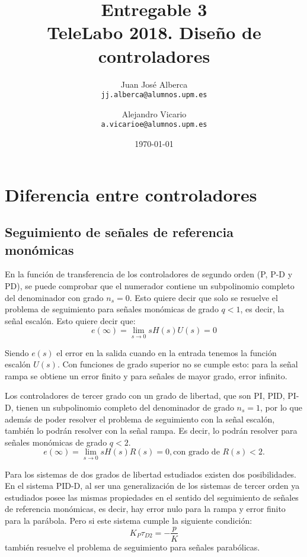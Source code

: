 \documentclass[a4paper]{article}
\begin{document}
\title{Entregable 3 \\
\large TeleLabo 2018. Diseño de controladores}
\author{
	Juan José Alberca\\
	\texttt{jj.alberca@alumnos.upm.es}
	\and
	Alejandro Vicario\\
	\texttt{a.vicarioe@alumnos.upm.es}
}
\date{\today}


\maketitle


\section{Diferencia entre controladores}
\subsection{Seguimiento de señales de referencia monómicas}
En la función de transferencia de los controladores de segundo orden (P, P-D y PD), se puede comprobar que el numerador contiene un subpolinomio completo del denominador con grado $n_s=0$. Esto quiere decir que solo se resuelve el problema de seguimiento para señales monómicas de grado $q<1$, es decir, la señal escalón. Esto quiere decir que:
\begin{equation}
	e(\infty)=\lim_{s \rightarrow 0}
	s H(s) U(s) = 0
\end{equation}

Siendo $e(s)$ el error en la salida cuando en la entrada tenemos la función escalón $U(s)$. Con funciones de grado superior no se cumple esto: para la señal rampa se obtiene un error finito y para señales de mayor grado, error infinito.

Los controladores de tercer grado con un grado de libertad, que son PI, PID, PI-D, tienen un subpolinomio completo del denominador de grado $n_s=1$, por lo que además de poder resolver el problema de seguimiento con la señal escalón, también lo podrán resolver con la señal rampa. Es decir, lo podrán resolver para señales monómicas de grado $q<2$.
\begin{equation}
e(\infty)=\lim_{s \rightarrow 0}
s H(s) R(s) = 0, \textrm{con grado de } R(s)<2. 
\end{equation}

Para los sistemas de dos grados de libertad estudiados existen dos posibilidades. En el sistema PID-D, al ser una generalización de los sistemas de tercer orden ya estudiados posee las mismas propiedades en el sentido del seguimiento de señales de referencia monómicas, es decir, hay error nulo para la rampa y error finito para la parábola. Pero si este sistema cumple la siguiente condición:
\begin{equation}
	K_P \tau_{D2} = -\frac{p}{K}
\end{equation}
también resuelve el problema de seguimiento para señales parabólicas.
\end{document}
